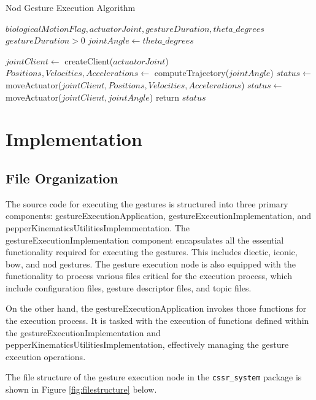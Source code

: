 \documentclass{CSSRforAfrica}
\begin{document}
\begin{algorithm}
	\caption{Nod Gesture Execution Algorithm}\label{alg:nod}
	\begin{algorithmic}
		\Require $biologicalMotionFlag,actuatorJoint, gestureDuration, theta\_degrees$
		\Ensure $gestureDuration > 0$
		\State $jointAngle \gets theta\_degrees$
		
		\State $jointClient \gets $ createClient($actuatorJoint$) 
			\State $Positions,Velocities, Accelerations \gets $ computeTrajectory($jointAngle$)
			\State $status \gets $ moveActuator($jointClient,Positions,Velocities, Accelerations$)
		\Else
			\State $status \gets $ moveActuator($jointClient,jointAngle$) 
		\EndIf
		\State return $status$
	\end{algorithmic}
\end{algorithm}


\newpage
\section{Implementation}
\subsection*{File Organization}
The source code for executing the gestures is structured into three primary components:
gestureExecutionApplication, gestureExecutionImplementation, and pepperKinematicsUtilitiesImplemmentation. The gestureExecutionImplementation component encapsulates all the essential functionality required for executing the gestures. This includes diectic, iconic, bow, and nod gestures. The gesture execution node is also equipped with the functionality to process various files critical for the execution process, which include configuration files, gesture descriptor files, and
topic files.

On the other hand, the gestureExecutionApplication invokes those functions for the execution process. It is tasked with the execution of functions defined within the gestureExecutionImplementation and pepperKinematicsUtilitiesImplementation, effectively
managing the gesture execution operations.

The file structure of the gesture execution node in the \texttt{cssr\_system} package is shown in Figure \ref{fig:filestructure} below.

\vspace*{0.5em}
\end{document}
